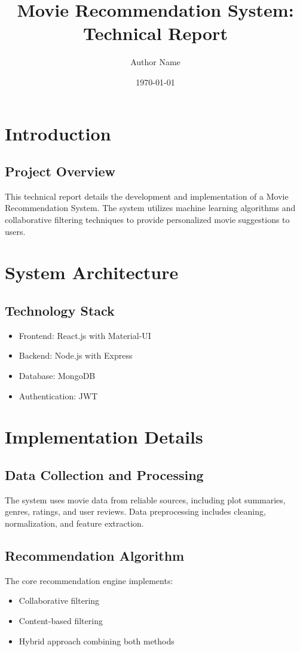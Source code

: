 \documentclass[12pt,a4paper]{article}
\title{Movie Recommendation System: Technical Report}
\author{Author Name}
\date{\today}
\begin{document}
\maketitle
\tableofcontents
\newpage

\section{Introduction}
\subsection{Project Overview}
This technical report details the development and implementation of a Movie Recommendation System. The system utilizes machine learning algorithms and collaborative filtering techniques to provide personalized movie suggestions to users.

\section{System Architecture}
\subsection{Technology Stack}
\begin{itemize}
    \item Frontend: React.js with Material-UI
    \item Backend: Node.js with Express
    \item Database: MongoDB
    \item Authentication: JWT
\end{itemize}

\section{Implementation Details}
\subsection{Data Collection and Processing}
The system uses movie data from reliable sources, including plot summaries, genres, ratings, and user reviews. Data preprocessing includes cleaning, normalization, and feature extraction.

\subsection{Recommendation Algorithm}
The core recommendation engine implements:
\begin{itemize}
    \item Collaborative filtering
    \item Content-based filtering
    \item Hybrid approach combining both methods
\end{itemize}
\end{document}
